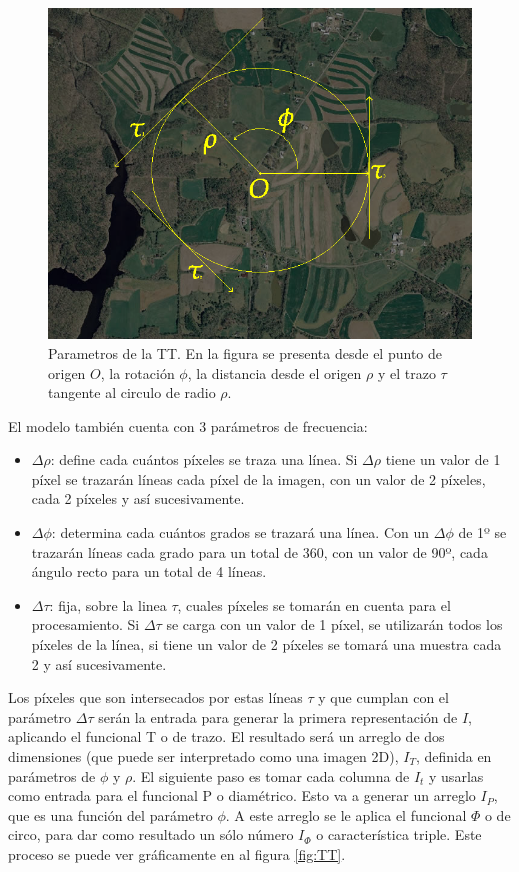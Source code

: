 \begin{figure}[h!]
    \centering
    \includegraphics[width=1\textwidth]{images/trazos.png}
    \caption{Parametros de la TT. En la figura se presenta desde el punto de origen $O$, la rotación $\phi$, la distancia desde el origen $\rho$ y el trazo $\tau$ tangente al circulo de radio $\rho$.}
    \label{fig:trazos}
\end{figure}

El modelo también cuenta con 3 parámetros de frecuencia:
\begin{itemize}
    \item $\Delta \rho$: define cada cuántos píxeles se traza una línea. Si $\Delta \rho$ tiene un valor de 1 píxel se trazarán líneas cada píxel de la imagen, con un valor de 2 píxeles, cada 2 píxeles y así sucesivamente.
    \item $\Delta \phi$: determina cada cuántos grados se trazará una línea. Con un $\Delta \phi$ de 1º se trazarán líneas cada grado para un total de 360, con un valor de 90º, cada ángulo recto para un total de 4 líneas.
    \item $\Delta \tau$: fija, sobre la linea $\tau$, cuales píxeles se tomarán en cuenta para el procesamiento. Si $\Delta \tau$ se carga con un valor de 1 píxel, se utilizarán todos los píxeles de la línea, si tiene un valor de 2 píxeles se tomará una muestra cada 2 y así sucesivamente.
\end{itemize}

Los píxeles que son intersecados por estas líneas $\tau$ y que cumplan con el parámetro $\Delta \tau$ serán la entrada para generar la primera representación de $I$, aplicando el funcional T o de trazo. El resultado será un arreglo de dos dimensiones (que puede ser interpretado como una imagen 2D), $I_T$, definida en parámetros de $\phi$ y $\rho$. El siguiente paso es tomar cada columna de $I_t$ y usarlas como entrada para el funcional P o diamétrico. Esto va a generar un arreglo $I_P$, que es una función del parámetro $\phi$. A este arreglo se le aplica el funcional $\Phi$ o de circo, para dar como resultado un sólo número $I_\Phi$ o característica triple. Este proceso se puede ver gráficamente en al figura \ref{fig:TT}.

